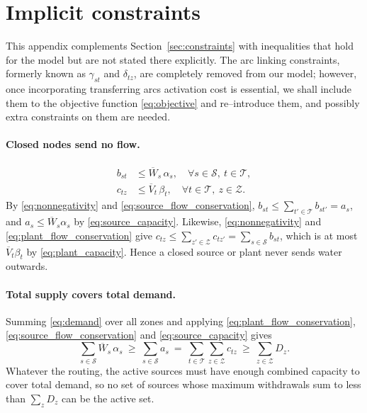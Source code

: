 \section{Implicit constraints}\label{sec:implicit_constraints}

This appendix complements Section~\ref{sec:constraints} with inequalities that hold for the model but are not stated there explicitly. 
The arc linking constraints, formerly known as $\gamma_{st}$ and $\delta_{tz}$, are completely removed from our model; however, once incorporating transferring arcs activation cost is essential, we shall include them to the objective function \eqref{eq:objective} and re–introduce them, and possibly extra constraints on them are needed.

\paragraph{Closed nodes send no flow.}
\begin{align}
    b_{st} & \le \overline{W}_s\,\alpha_s, \quad \forall s \in \mathcal{S},\ t \in \mathcal{T}, \label{eq:closed_source} \\
    c_{tz} & \le \overline{V}_t\,\beta_t, \quad \forall t \in \mathcal{T},\ z \in \mathcal{Z}. \label{eq:closed_plant}
\end{align}
By \eqref{eq:nonnegativity} and \eqref{eq:source_flow_conservation}, $b_{st} \le \sum_{t' \in \mathcal{T}} b_{st'} = a_s$, and $a_s \le \overline{W}_s\alpha_s$ by \eqref{eq:source_capacity}.
Likewise, \eqref{eq:nonnegativity} and \eqref{eq:plant_flow_conservation} give $c_{tz} \le \sum_{z' \in \mathcal{Z}} c_{tz'} = \sum_{s \in \mathcal{S}} b_{st}$, which is at most $\overline{V}_t\beta_t$ by \eqref{eq:plant_capacity}.
Hence a closed source or plant never sends water outwards.

\paragraph{Total supply covers total demand.}
Summing \eqref{eq:demand} over all zones and applying \eqref{eq:plant_flow_conservation}, \eqref{eq:source_flow_conservation} and \eqref{eq:source_capacity} gives
\begin{equation}\label{eq:total_supply}
    \sum_{s \in \mathcal{S}} \overline{W}_s\,\alpha_s
    \ \ge\ \sum_{s \in \mathcal{S}} a_s
    \ =\ \sum_{t \in \mathcal{T}} \sum_{z \in \mathcal{Z}} c_{tz}
    \ \ge\ \sum_{z \in \mathcal{Z}} D_z.
\end{equation}
Whatever the routing, the active sources must have enough combined capacity to cover total demand, so no set of sources whose maximum withdrawals sum to less than $\sum_z D_z$ can be the active set.

